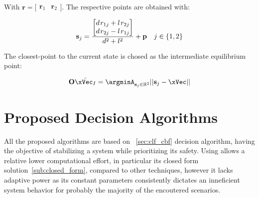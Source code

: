     

With \(\mathbf{r} = \bigl[\begin{smallmatrix} \mathbf{r}_1&\mathbf{r}_2\end{smallmatrix} \bigr]\). The respective points are obtained with:

\begin{equation}
    \mathbf{s}_j = \frac{\begin{bmatrix} d \hspace{0.1em}r_{1j} + l \hspace{0.1em}r_{2j} \\ d \hspace{0.1em} r_{2j} - l \hspace{0.1em} r_{1j}\end{bmatrix}}{d^2 + l^2} + \mathbf{p} \quad j\in \{1,2\}
    \label{eq:Constraint_Tangent_Points}
\end{equation}

The closest-point to the current state is chosed as the intermediate equilibrium point:

\begin{equation}
    \mathbf{O}\bar{\xVec_I} = \argminA_{\mathbf{s}_j \in \mathbb{R}^2} ||\mathbf{s}_j - \xVec|| 
    \label{eq:Intermediate_Equilibrium_Point}
\end{equation}



\newpage %


\section{Proposed Decision Algorithms}
\label{sec:Proposed_Propagation_Algorithms}

All the proposed algorithms are based on ~\ref{sec:clf_cbf} decision algorithm, having the objective of stabilizing a system while prioritizing its safety. Using  allows a relative lower computational effort, in particular its closed form solution~\ref{sub:closed_form}, compared to other techniques, however it lacks adaptive power as its constant parameters consistently dictates an inneficient system behavior for probably the majority of the encoutered scenarios. \\    


